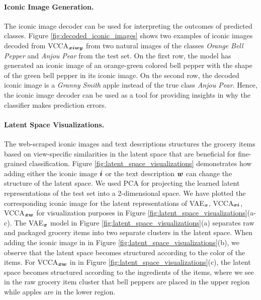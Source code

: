 \paragraph{Iconic Image Generation.} The iconic image decoder can be used for interpreting the outcomes of predicted classes. Figure \ref{fig:decoded_iconic_images} shows two examples of iconic images decoded from VCCA$_{{\bm{x}} {\bm{i}} {\bm{w}} {\bm{y}}}$ from two natural images of the classes \textit{Orange Bell Pepper} and \textit{Anjou Pear} from the test set. On the first row, %
the model has generated an iconic image of an orange-green colored bell pepper with the shape of the green bell pepper in its iconic image. On the second row, %
the decoded iconic image is a \textit{Granny Smith} apple instead of the true class \textit{Anjou Pear}. Hence, the iconic image decoder can be used as a tool for providing insights in why the classifier makes prediction errors. 




\vspace{-3mm}
\paragraph{Latent Space Visualizations.} The web-scraped iconic images and text descriptions structures the grocery items based on view-specific similarities in the latent space that are beneficial for fine-grained classification. Figure \ref{fig:latent_space_visualizations} demonstrates how adding either the iconic image ${\bm{i}}$ or the text description ${\bm{w}}$ can change the structure of the latent space. We used PCA for projecting the learned latent representations of the test set into a 2-dimensional space. We have plotted the corresponding iconic image for the latent representations of VAE$_{{\bm{x}}}$, VCCA$_{{\bm{x}} {\bm{i}}}$, VCCA$_{{\bm{x}} {\bm{w}}}$ for visualization purposes in Figure \ref{fig:latent_space_visualizations}(a-c).  
The VAE$_{{\bm{x}}}$ model in Figure \ref{fig:latent_space_visualizations}(a) separates raw and packaged grocery items into two separate clusters in the latent space. 
When adding the iconic image in in Figure \ref{fig:latent_space_visualizations}(b), we observe that the latent space becomes structured according to the color of the items. 
For VCCA$_{{\bm{x}} {\bm{w}}}$ in in Figure \ref{fig:latent_space_visualizations}(c), the latent space becomes structured according to the ingredients of the items, where we see in the raw grocery item cluster that bell peppers are placed in the upper region while apples are in the lower region. 

